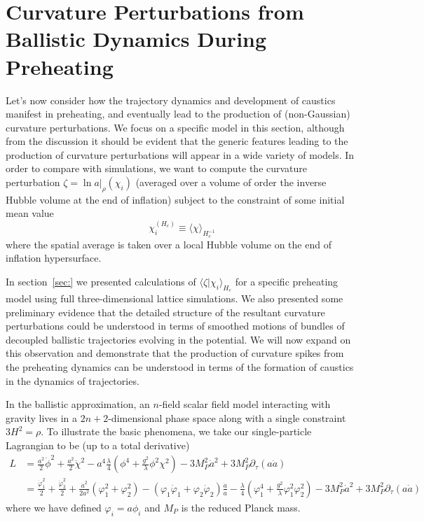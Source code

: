 \section{Curvature Perturbations from Ballistic Dynamics During Preheating}
Let's now consider how the trajectory dynamics and development of caustics manifest in preheating, and eventually lead to the production of (non-Gaussian) curvature perturbations.
We focus on a specific model in this section, although from the discussion it should be evident that the generic features leading to the production of curvature perturbations will appear in a wide variety of models.
In order to compare with simulations, we want to compute the curvature perturbation $\zeta = \ln a|_{\rho}(\chi_i)$ (averaged over a volume of order the inverse Hubble volume at the end of inflation) subject to the constraint of some initial mean value
\begin{equation}
  \chi_i^{(H_e)} \equiv \langle \chi \rangle_{H_e^{-1}}
\end{equation}
where the spatial average is taken over a local Hubble volume on the end of inflation hypersurface.

In section~\ref{sec:} we presented calculations of $\langle \zeta | \chi_i \rangle_{H_e}$ for a specific preheating model using full three-dimensional lattice simulations.
We also presented some preliminary evidence that the detailed structure of the resultant curvature perturbations could be understood in terms of smoothed motions of bundles of decoupled ballistic trajectories evolving in the potential.
We will now expand on this observation and demonstrate that the production of curvature spikes from the preheating dynamics can be understood in terms of the formation of caustics in the dynamics of trajectories.

In the ballistic approximation, an $n$-field scalar field model interacting with gravity lives in a $2n+2$-dimensional phase space along with a single constraint $3H^2 = \rho$.
To illustrate the basic phenomena, we take our single-particle Lagrangian to be (up to a total derivative)
\begin{align}
  L &= \frac{a^2}{2}\dot{\phi}^2 + \frac{a^2}{2}\dot{\chi}^2 - a^4\frac{\lambda}{4}\left(\phi^4 + \frac{g^2}{\lambda}\phi^2\chi^2\right) - 3M_P^2\dot{a}^2 + 3M_P^2\partial_\tau(a\dot{a}) \\
    &= \frac{\dot{\varphi}_1^2}{2} + \frac{\dot{\varphi}_2^2}{2} +\frac{\dot{a}^2}{2a^2}\left(\varphi_1^2 + \varphi_2^2\right) - \left(\varphi_1\dot{\varphi}_1 + \varphi_2\dot{\varphi}_2\right)\frac{\dot{a}}{a} - \frac{\lambda}{4}\left(\varphi_1^4 + \frac{g^2}{\lambda}\varphi_1^2\varphi_2^2\right) - 3M_P^2\dot{a}^2 + 3M_P^2\partial_\tau(a\dot{a})
\end{align}
where we have defined $\varphi_i = a\phi_i$ and $M_P$ is the reduced Planck mass.

